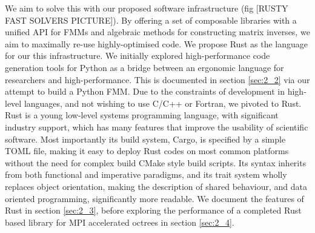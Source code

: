 We aim to solve this with our proposed software infrastructure (fig [RUSTY FAST SOLVERS PICTURE]). By offering a set of composable libraries with a unified API for FMMs and algebraic methods for constructing matrix inverses, we aim to maximally re-use highly-optimised code. We propose Rust as the language for our this infrastructure. We initially explored high-performance code generation tools for Python as a bridge between an ergonomic language for researchers and high-performance. This is documented in section \ref{sec:2_2} via our attempt to build a Python FMM. Due to the constraints of development in high-level languages, and not wishing to use C/C++ or Fortran, we pivoted to Rust. Rust is a young low-level systems programming language, with significant industry support, which has many features that improve the usability of scientific software. Most importantly its build system, Cargo, is specified by a simple TOML file, making it easy to deploy Rust codes on most common platforms without the need for complex build CMake style build scripts. Its syntax inherits from both functional and imperative paradigms, and its trait system wholly replaces object orientation, making the description of shared behaviour, and data oriented programming, significantly more readable. We document the features of Rust in section \ref{sec:2_3}, before exploring the performance of a completed Rust based library for MPI accelerated octrees in section \ref{sec:2_4}.